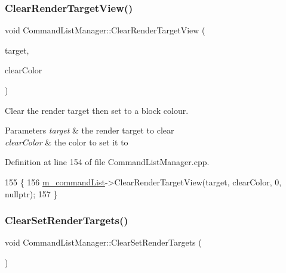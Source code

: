 \subsubsection{\texorpdfstring{Clear\+Render\+Target\+View()}{ClearRenderTargetView()}}
{\footnotesize\ttfamily void Command\+List\+Manager\+::\+Clear\+Render\+Target\+View (\begin{DoxyParamCaption}\item[{const D3\+D12\+\_\+\+C\+P\+U\+\_\+\+D\+E\+S\+C\+R\+I\+P\+T\+O\+R\+\_\+\+H\+A\+N\+D\+LE \&}]{target,  }\item[{Direct\+X\+::\+X\+M\+V\+E\+C\+T\+O\+R\+F32}]{clear\+Color }\end{DoxyParamCaption})\hspace{0.3cm}{\ttfamily [private]}}



Clear the render target then set to a block colour. 


\begin{DoxyParams}{Parameters}
{\em target} & the render target to clear \\
\hline
{\em clear\+Color} & the color to set it to \\
\hline
\end{DoxyParams}


Definition at line 154 of file Command\+List\+Manager.\+cpp.


\begin{DoxyCode}
155 \{
156     \mbox{\hyperlink{class_command_list_manager_a1366f0acddca408167ffcab59be71ddb}{m\_commandList}}->ClearRenderTargetView(target, clearColor, 0, \textcolor{keyword}{nullptr});
157 \}
\end{DoxyCode}
\mbox{\label{class_command_list_manager_adbe4e0341431cc06d195dd2172f124a9}} 
\subsubsection{\texorpdfstring{Clear\+Set\+Render\+Targets()}{ClearSetRenderTargets()}}
{\footnotesize\ttfamily void Command\+List\+Manager\+::\+Clear\+Set\+Render\+Targets (\begin{DoxyParamCaption}{ }\end{DoxyParamCaption})}



